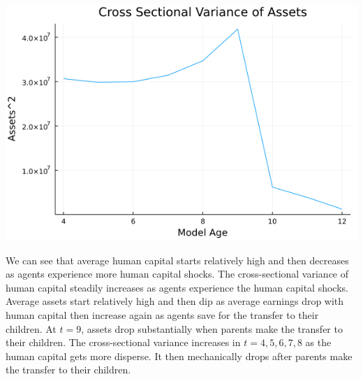 \documentclass{article}
\begin{document}
\begin{enumerate}
\begin{center}
\includegraphics[scale =0.5]{var_assets}

\end{center}

We can see that average human capital starts relatively high and then decreases as agents experience more human capital shocks.  The cross-sectional variance of human capital steadily increases as agents experience the human capital shocks.  Average assets start relatively high and then dip as average earnings drop with human capital then increase again as agents save for the transfer to their children.  At $t=9$, assets drop substantially when parents make the transfer to their children.  The cross-sectional variance increases in $t=4, 5, 6, 7, 8$ as the human capital gets more disperse.  It then mechanically drops after parents make the transfer to their children.



\end{enumerate}
\end{document}

